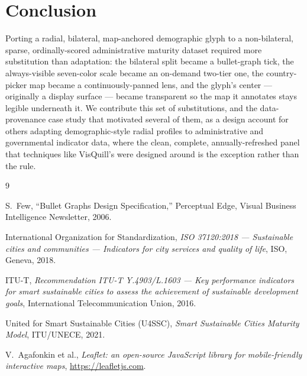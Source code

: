 \documentclass[10pt,twocolumn]{article}
\begin{document}
\section{Conclusion}
Porting a radial, bilateral, map-anchored demographic glyph to a non-bilateral, sparse, ordinally-scored administrative maturity dataset required more substitution than adaptation: the bilateral split became a bullet-graph tick, the always-visible seven-color scale became an on-demand two-tier one, the country-picker map became a continuously-panned lens, and the glyph's center — originally a display surface — became transparent so the map it annotates stays legible underneath it. We contribute this set of substitutions, and the data-provenance case study that motivated several of them, as a design account for others adapting demographic-style radial profiles to administrative and governmental indicator data, where the clean, complete, annually-refreshed panel that techniques like VisQuill's were designed around is the exception rather than the rule.


\begin{thebibliography}{9}

S.~Few, ``Bullet Graphs Design Specification,'' Perceptual Edge, Visual Business Intelligence Newsletter, 2006.

International Organization for Standardization, \emph{ISO 37120:2018 — Sustainable cities and communities — Indicators for city services and quality of life}, ISO, Geneva, 2018.

ITU-T, \emph{Recommendation ITU-T Y.4903/L.1603 — Key performance indicators for smart sustainable cities to assess the achievement of sustainable development goals}, International Telecommunication Union, 2016.

United for Smart Sustainable Cities (U4SSC), \emph{Smart Sustainable Cities Maturity Model}, ITU/UNECE, 2021.

V.~Agafonkin et al., \emph{Leaflet: an open-source JavaScript library for mobile-friendly interactive maps}, \url{https://leafletjs.com}.

\end{thebibliography}
\end{document}
